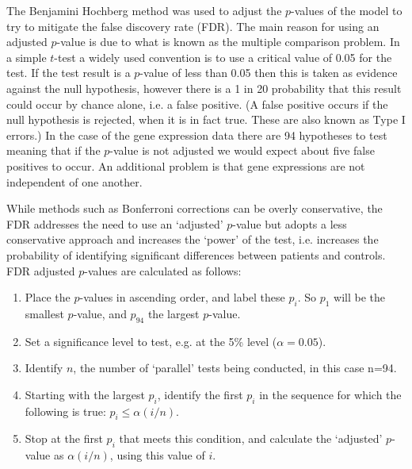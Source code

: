 \documentclass[a4paper, 12pt]{report}
\begin{document}
The Benjamini Hochberg \cite{FDR} method was used to adjust the $p$-values of the model to try to mitigate the false discovery rate (\gls{FDR}). The main reason for using an adjusted $p$-value is due to what is known as the multiple comparison problem. In a simple $t$-test a widely used convention is to use a critical value of 0.05 for the test. If the test result is a $p$-value of less than 0.05 then this is taken as evidence against the null hypothesis, however there is a 1 in 20 probability that this result could occur by chance alone, i.e. a false positive. (A false positive occurs if the null hypothesis is rejected, when it is in fact true. These are also known as Type I errors.)  In the case of the gene expression data there are 94 hypotheses to test meaning that if the $p$-value is not adjusted we would expect about five false positives to occur. An additional problem is that gene expressions are not independent of one another.

While methods such as Bonferroni corrections can be overly conservative, the FDR addresses the need to use an `adjusted' $p$-value but adopts a less conservative approach and increases the ‘power’ of the test, i.e. increases the probability of identifying significant differences between patients and controls.  FDR adjusted $p$-values are calculated as follows:

\begin{enumerate}

\item Place the $p$-values in ascending order, and label these $p_i$. So $p_1$ will be the smallest $p$-value, and $p_{94}$ the largest $p$-value.
\item Set a significance level to test, e.g. at the 5\% level ($\alpha= 0.05$).
\item Identify $n$, the number of ‘parallel’ tests being conducted, in this case n=94.
\item Starting with the largest $p_i$, identify the first $p_i$ in the sequence for which the following is true: $p_i \le \alpha(i / n)$.
\item Stop at the first $p_i$ that meets this condition, and calculate the `adjusted' $p$-value as $\alpha (i / n)$, using this value of $i$.

\end{enumerate}

\end{document}
